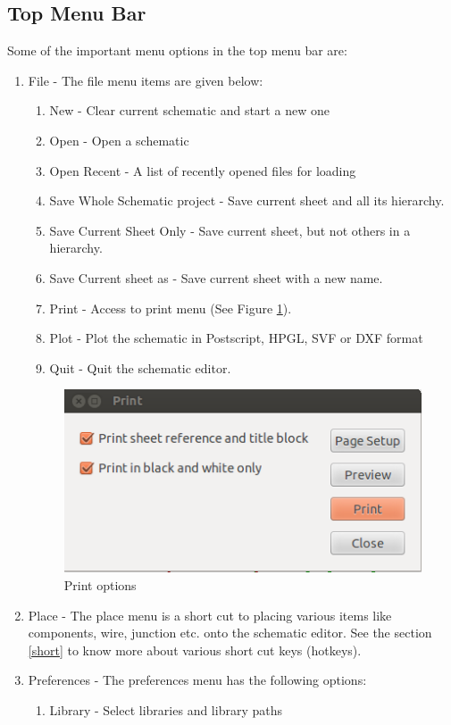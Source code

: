 \subsection{Top Menu Bar}
Some of the important menu options in the top menu bar are:
\begin{enumerate}
\item File - 
The file menu items are given below:
\begin{enumerate}
\item New - Clear current schematic and start a new one
\item Open - Open a schematic 
\item Open Recent - A list of recently opened files for loading
\item Save Whole Schematic project - Save current sheet and all its hierarchy.
\item Save Current Sheet Only - Save current sheet, but not others in a hierarchy.
\item Save Current sheet as - Save current sheet with a new name.
\item Print - Access to print menu (See Figure \ref{print}).
\item Plot - Plot the schematic in Postscript, HPGL, SVF or DXF format 
\item Quit - Quit the schematic editor. 
\end{enumerate}
\begin{figure}
\begin{center}
\includegraphics[width=0.5\linewidth]{figures/print.png}%
\caption{Print options}
\label{print}
\end{center}
\end{figure}
\item Place - 
The place menu is a short cut to placing various items like components, wire, junction etc. onto the schematic editor. See the section \ref{short} to know more about various short cut keys (hotkeys).
\item Preferences - 
The preferences menu has the following options:
\begin{enumerate}
\item Library - Select libraries and library paths

\end{enumerate}
\end{enumerate}
